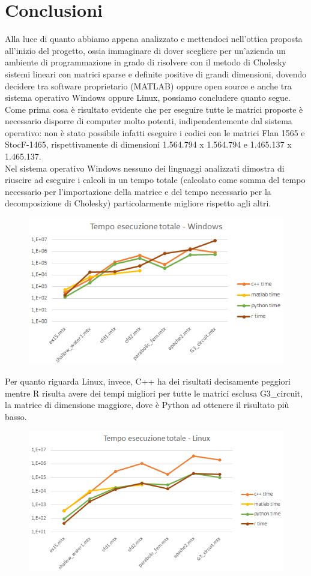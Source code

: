 \documentclass[a4paper,10pt]{article}
\begin{document}
\newpage

\section{Conclusioni}

Alla luce di quanto abbiamo appena analizzato e mettendoci nell’ottica proposta all’inizio del progetto, ossia immaginare di dover scegliere per un’azienda un ambiente di programmazione in grado di risolvere con il metodo di Cholesky sistemi lineari con matrici sparse e deﬁnite positive di grandi dimensioni, dovendo decidere tra software proprietario (MATLAB) oppure open source e anche tra sistema operativo Windows oppure Linux, possiamo concludere quanto segue.\\

Come prima cosa è risultato evidente che per eseguire tutte le matrici proposte è necessario disporre di computer molto potenti, indipendentemente dal sistema operativo: non è stato possibile infatti eseguire i codici con le matrici Flan 1565 e StocF-1465, rispettivamente di dimensioni 1.564.794 x 1.564.794 e 1.465.137 x 1.465.137.\\

Nel sistema operativo Windows nessuno dei linguaggi analizzati dimostra di riuscire ad eseguire i calcoli in un tempo totale (calcolato come somma del tempo necessario per l'importazione della matrice e del tempo necessario per la decomposizione di Cholesky) particolarmente migliore rispetto agli altri.

\begin{figure}[H]
\centering
  \includegraphics[width=0.6\linewidth]{img/tempototwin.png}
\end{figure}

Per quanto riguarda Linux, invece, C++ ha dei risultati decisamente peggiori mentre R risulta avere dei tempi migliori per tutte le matrici esclusa G3\_circuit, la matrice di dimensione maggiore, dove è Python ad ottenere il risultato più basso.

\begin{figure}[H]
\centering
  \includegraphics[width=0.6\linewidth]{img/tempototlinux.png}
\end{figure}
\end{document}

